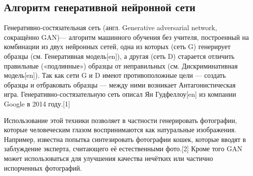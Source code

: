\subsection*{Алгоритм генеративной нейронной сети}
Генеративно-состязательная сеть (англ. Generative adversarial network, сокращённо GAN)— алгоритм машинного обучения без учителя, построенный на комбинации из двух нейронных сетей, одна из которых (сеть G) генерирует образцы (см. Генеративная модель[en]), а другая (сеть D) старается отличить правильные («подлинные») образцы от неправильных (см. Дискриминативная модель[en]). Так как сети G и D имеют противоположные цели — создать образцы и отбраковать образцы — между ними возникает Антагонистическая игра. Генеративно-состязательную сеть описал Ян Гудфеллоу[en] из компании Google в 2014 году.[1]

Использование этой техники позволяет в частности генерировать фотографии, которые человеческим глазом воспринимаются как натуральные изображения. Например, известна попытка синтезировать фотографии кошек, которые вводят в заблуждение эксперта, считающего её естественными фото.[2] Кроме того GAN может использоваться для улучшения качества нечётких или частично испорченных фотографий.